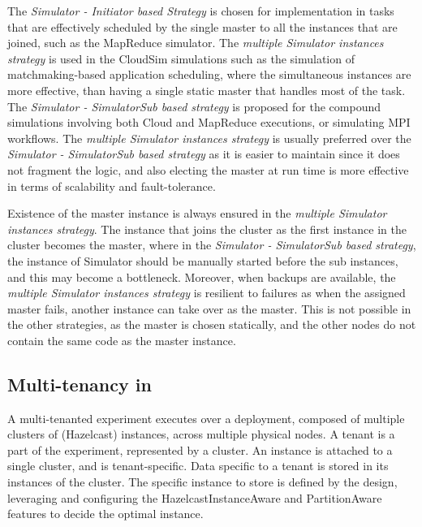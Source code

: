 The \textit{Simulator - Initiator based Strategy} is chosen for implementation in tasks that are effectively scheduled by the single master to all the instances that are joined, such as the MapReduce simulator. The \textit{multiple Simulator instances strategy} is used in the CloudSim simulations such as the simulation of matchmaking-based application scheduling, where the simultaneous instances are more effective, than having a single static master that handles most of the task. The \textit{Simulator - SimulatorSub based strategy} is proposed for the compound simulations involving both Cloud and MapReduce executions, or simulating MPI workflows. The \textit{multiple Simulator instances strategy} is usually preferred over the \textit{Simulator - SimulatorSub based strategy} as it is easier to maintain since it does not fragment the logic, and also electing the master at run time is more effective in terms of scalability and fault-tolerance.

Existence of the master instance is always ensured in the \textit{multiple Simulator instances strategy}. The instance that joins the cluster as the first instance in the cluster becomes the master, where in the \textit{Simulator - SimulatorSub based strategy}, the instance of Simulator should be manually started before the sub instances, and this may become a bottleneck. Moreover, when backups are available, the \textit{multiple Simulator instances strategy} is resilient to failures as when the assigned master fails, another instance can take over as the master. This is not possible in the other strategies, as the master is chosen statically, and the other nodes do not contain the same code as the master instance.

\subsection{Multi-tenancy in }
A multi-tenanted experiment executes over a deployment, composed of multiple clusters of (Hazelcast) instances, across multiple physical nodes. A tenant is a part of the experiment, represented by a cluster. An instance is attached to a single cluster, and is tenant-specific. Data specific to a tenant is stored in its instances of the cluster. The specific instance to store is defined by the  design, leveraging and configuring the HazelcastInstanceAware and PartitionAware features to decide the optimal instance.

